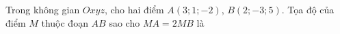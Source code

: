 \begin{ex}
Trong không gian $Oxyz$, cho hai điểm $A(3;1;-2)$, $B(2;-3;5)$. Tọa độ của điểm $M$ thuộc đoạn $AB$ sao cho $MA=2MB$ là
\end{ex}
